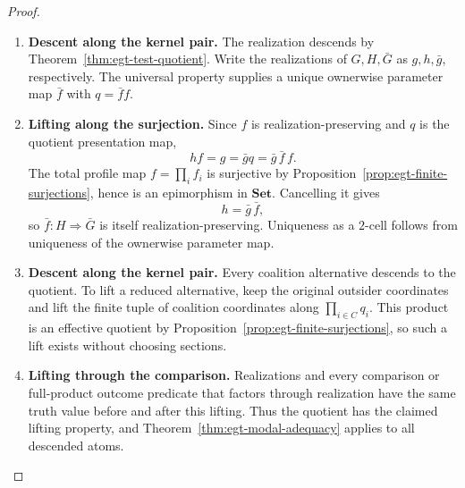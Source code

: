 \documentclass[11pt,a4paper]{article}
\numberwithin{equation}{section}
\theoremstyle{definition}
\theoremstyle{remark}
\theoremstyle{plain}
\begin{document}
\begin{proof}
\leavevmode
\begin{enumerate}[label=\textup{(\arabic*)},leftmargin=*,itemsep=4pt,topsep=3pt]
  \item \textbf{Descent along the kernel pair.} The realization descends by Theorem~\ref{thm:egt-test-quotient}. Write the
realizations of $G,H,\bar G$ as $g,h,\bar g$, respectively. The universal
property supplies a unique ownerwise parameter map $\bar f$ with
$q=\bar f f$.
  \item \textbf{Lifting along the surjection.} Since $f$ is realization-preserving and $q$ is the quotient
presentation map,
\[
 h f=g=\bar g q=\bar g\,\bar f\,f.
\]
The total profile map $f=\prod_i f_i$ is surjective by
Proposition~\ref{prop:egt-finite-surjections}, hence is an epimorphism in
$\mathbf{Set}$. Cancelling it gives
\[
 h=\bar g\,\bar f,
\]
so $\bar f:H\Rightarrow\bar G$ is itself realization-preserving. Uniqueness
as a $2$-cell follows from uniqueness of the ownerwise parameter map.
  \item \textbf{Descent along the kernel pair.} Every coalition alternative descends to the quotient. To lift a reduced
alternative, keep the original outsider coordinates and lift the finite tuple
of coalition coordinates along $\prod_{i\in C}q_i$. This product
is an effective quotient by Proposition~\ref{prop:egt-finite-surjections}, so
such a lift exists without choosing sections.
  \item \textbf{Lifting through the comparison.} Realizations and every
comparison or full-product outcome predicate that factors through realization
have the same truth value before and after this lifting. Thus the quotient has the claimed lifting property, and
Theorem~\ref{thm:egt-modal-adequacy} applies to all descended atoms.
\end{enumerate}
\end{proof}
\end{document}
